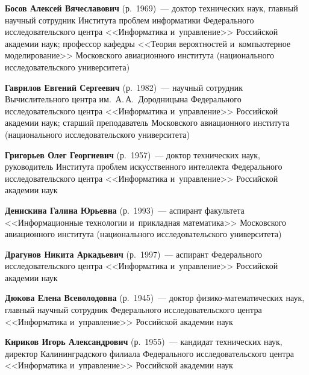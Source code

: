 \begin{multicols}{2}
\vspace*{3pt}

\noindent
\textbf{Босов Алексей Вячеславович} (р.\ 1969)~--- 
доктор технических наук, главный научный сотрудник Института проб\-лем 
информатики Федерального исследовательского цент\-ра <<Информатика и~управ\-ле\-ние>>
 Российской академии наук; профессор ка\-фед\-ры <<Тео\-рия вероятностей и~компьютерное моделирование>>
  Московского авиационного института (национального исследовательского университета)
  
\vspace*{3pt}

\noindent
\textbf{Гаврилов Евгений Сергеевич} (р.\ 1982)~--- 
научный сотрудник Вычислительного центра им.\ А.\,А.~Дородницына 
Федерального исследовательского цент\-ра <<Информатика и~управ\-ле\-ние>>
Российской академии наук; старший преподаватель Московского авиационного института 
(национального исследовательского университета)

\vspace*{3pt}

\noindent
\textbf{Григорьев Олег Георгиевич} (р.\ 1957)~--- 
доктор технических наук, руководитель Института проб\-лем искусственного интеллекта Федерального 
исследовательского цент\-ра <<Информатика и~управ\-ле\-ние>> Российской академии наук

\vspace*{3pt}

\noindent
\textbf{Денискина Галина Юрьевна} (р.\ 1993)~--- 
аспирант факультета <<Информационные технологии и~прик\-лад\-ная математика>>
 Московского авиационного института (национального исследовательского университета)
 
 \vspace*{3pt}
 
\noindent
\textbf{Драгунов Никита Аркадьевич} (р.\ 1997)~--- 
аспирант Федерального исследовательского цент\-ра <<Информатика и~управ\-ле\-ние>> Российской академии наук 

 \vspace*{3pt}
 
\noindent
\textbf{Дюкова Елена Всеволодовна} (р.\ 1945)~--- 
доктор фи\-зи\-ко-ма\-те\-ма\-ти\-че\-ских наук, 
главный научный со\-труд\-ник Федерального исследовательского цент\-ра 
<<Информатика и~управ\-ле\-ние>> Российской академии наук

\vspace*{3pt}
 
 \noindent
\textbf{Кириков Игорь Александрович} (р.\ 1955)~--- 
кандидат технических наук, директор Калининградского филиала Федерального исследовательского цент\-ра 
<<Информатика и~управ\-ле\-ние>> Российской академии наук
 

\end{multicols}
